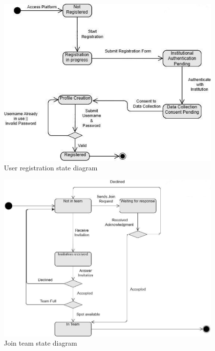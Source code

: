 \begin{figure}[H]
    \begin{center}
        \includegraphics[width=0.9\linewidth]{Images/User-registration.jpg}
        \caption{User registration state diagram}
        \label{fig:state_diagram_1}%
    \end{center}
\end{figure}

\begin{figure}[H]
    \begin{center}
        \includegraphics[width=0.9\linewidth]{Images/join-team.jpg}
        \caption{Join team state diagram}
        \label{fig:state_diagram_4}%
    \end{center}
\end{figure}

